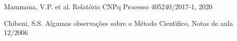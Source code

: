 \documentclass[
12pt,		%
openright,	%
twoside,  %
a4paper,			%
chapter=TITLE,		%
english,			%
french,				%
spanish,			%
brazil				%
]{USPSC-classe/USPSC}
\begin{document}
\begin{flushleft}
\begin{flushleft}
\begin{flushleft}
\begin{flushleft}
\begin{flushleft}
\begin{flushleft}
\begin{flushleft}
\begin{flushleft}
[CNPq, 2020] Mammana, V.P. et al. Relat\'orio CNPq Processo 405240/2017-1, 2020
\end{flushleft}


\end{flushleft}


\end{flushleft}


\end{flushleft}


\end{flushleft}


\end{flushleft}


\end{flushleft}


\end{flushleft}


\begin{flushleft}
\begin{flushleft}
\begin{flushleft}
\begin{flushleft}
\begin{flushleft}
\begin{flushleft}
\begin{flushleft}
\begin{flushleft}
[CHIBENI, 2006] Chibeni, S.S. Algumas observa\c{c}\~oes sobre o M\'etodo Cient\'{\i}fico, Notas de aula 12/2006
\end{flushleft}


\end{flushleft}


\end{flushleft}


\end{flushleft}


\end{flushleft}


\end{flushleft}


\end{flushleft}


\end{flushleft}
\end{document}
